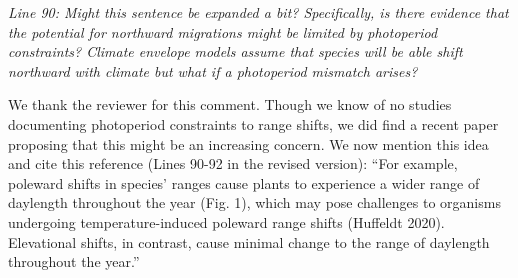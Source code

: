 \documentclass{article}
\begin{document}
\par \emph{Line 90: Might this sentence be expanded a bit? Specifically, is there evidence that the potential for northward migrations might be limited by photoperiod constraints? Climate envelope models assume that species will be able shift northward with climate but what if a photoperiod mismatch arises? }
\par We thank the reviewer for this comment. Though we know of no studies documenting photoperiod constraints to range shifts, we did find a recent paper proposing that this might be an increasing concern. We now mention this idea and cite this reference (Lines 90-92 in the revised version):
``For example, poleward shifts in species' ranges cause plants to experience a wider range of daylength throughout the year (Fig. 1), which may pose challenges to organisms undergoing temperature-induced poleward range shifts (Huffeldt 2020). Elevational shifts, in contrast, cause minimal change to the range of daylength throughout the year.''
\end{document}
